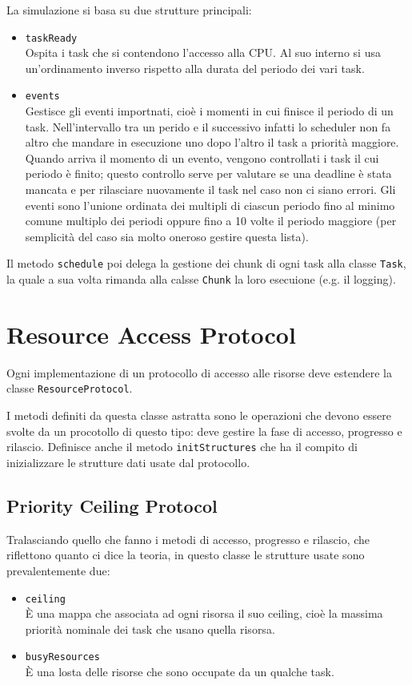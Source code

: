 \myskip

La simulazione si basa su due strutture principali:
\begin{itemize}
    \item \texttt{taskReady} \\
        Ospita i task che si contendono l'accesso alla CPU. Al suo interno si usa un'ordinamento inverso rispetto alla durata del periodo dei vari task.
    \item \texttt{events} \\
        Gestisce gli eventi importnati, cioè i momenti in cui finisce il periodo di un task. Nell'intervallo tra un perido e il successivo infatti lo scheduler non fa altro che mandare in esecuzione uno dopo l'altro il task a priorità maggiore. Quando arriva il momento di un evento, vengono controllati i task il cui periodo è finito; questo controllo serve per valutare se una deadline è stata mancata e per rilasciare nuovamente il task nel caso non ci siano errori. Gli eventi sono l’unione ordinata dei multipli di ciascun periodo fino al minimo comune multiplo dei periodi oppure fino a 10 volte il periodo maggiore (per semplicità del caso sia molto oneroso gestire questa lista).
\end{itemize}

\myskip

Il metodo \texttt{schedule} poi delega la gestione dei chunk di ogni task alla classe \texttt{Task}, la quale a sua volta rimanda alla calsse \texttt{Chunk} la loro esecuione (e.g. il logging).

\section{Resource Access Protocol}
Ogni implementazione di un protocollo di accesso alle risorse deve estendere la classe \texttt{ResourceProtocol}.

I metodi definiti da questa classe astratta sono le operazioni che devono essere svolte da un procotollo di questo tipo: deve gestire la fase di accesso, progresso e rilascio. Definisce anche il metodo \texttt{initStructures} che ha il compito di inizializzare le strutture dati usate dal protocollo.

\subsection{Priority Ceiling Protocol}
Tralasciando quello che fanno i metodi di accesso, progresso e rilascio, che riflettono quanto ci dice la teoria, in questo classe le strutture usate sono prevalentemente due:
\begin{itemize}
    \item \texttt{ceiling} \\
        È una mappa che associata ad ogni risorsa il suo ceiling, cioè la massima priorità nominale dei task che usano quella risorsa.
    \item \texttt{busyResources}\\
        È una losta delle risorse che sono occupate da un qualche task.
\end{itemize}

